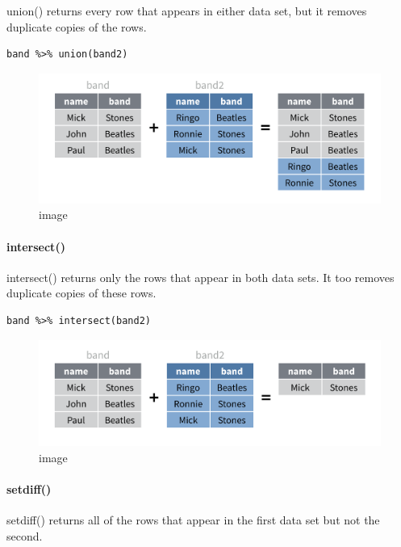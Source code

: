 \documentclass[
]{article}
\begin{document}
union() returns every row that appears in either data set, but it
removes duplicate copies of the rows.

\begin{verbatim}
band %>% union(band2)
\end{verbatim}

\begin{figure}
\centering
\includegraphics{data/union.png}
\caption{image}
\end{figure}

\hypertarget{intersect}{%
\paragraph{intersect()}\label{intersect}}

intersect() returns only the rows that appear in both data sets. It too
removes duplicate copies of these rows.

\begin{verbatim}
band %>% intersect(band2)
\end{verbatim}

\begin{figure}
\centering
\includegraphics{data/intersect.png}
\caption{image}
\end{figure}

\hypertarget{setdiff}{%
\paragraph{setdiff()}\label{setdiff}}

setdiff() returns all of the rows that appear in the first data set but
not the second.
\end{document}
